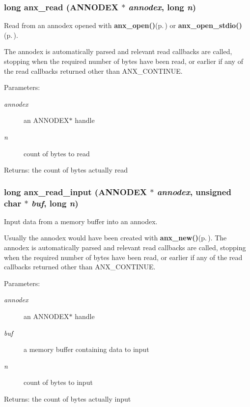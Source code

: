 \subsubsection{\setlength{\rightskip}{0pt plus 5cm}long anx\_\-read ({\bf ANNODEX} $\ast$ {\em annodex}, long {\em n})}\label{anx__read_8h_a16}


Read from an annodex opened with {\bf anx\_\-open()}{\rm (p.\,\pageref{anx__general_8h_a3})} or {\bf anx\_\-open\_\-stdio()}{\rm (p.\,\pageref{anx__general_8h_a4})}. 

The annodex is automatically parsed and relevant read callbacks are called, stopping when the required number of bytes have been read, or earlier if any of the read callbacks returned other than ANX\_\-CONTINUE. \begin{Desc}
\item[Parameters:]
\begin{description}
\item[{\em annodex}]an ANNODEX$\ast$ handle \item[{\em n}]count of bytes to read \end{description}
\end{Desc}
\begin{Desc}
\item[Returns:]the count of bytes actually read \end{Desc}
\subsubsection{\setlength{\rightskip}{0pt plus 5cm}long anx\_\-read\_\-input ({\bf ANNODEX} $\ast$ {\em annodex}, unsigned char $\ast$ {\em buf}, long {\em n})}\label{anx__read_8h_a17}


Input data from a memory buffer into an annodex. 

Usually the annodex would have been created with {\bf anx\_\-new()}{\rm (p.\,\pageref{anx__general_8h_a5})}. The annodex is automatically parsed and relevant read callbacks are called, stopping when the required number of bytes have been read, or earlier if any of the read callbacks returned other than ANX\_\-CONTINUE. \begin{Desc}
\item[Parameters:]
\begin{description}
\item[{\em annodex}]an ANNODEX$\ast$ handle \item[{\em buf}]a memory buffer containing data to input \item[{\em n}]count of bytes to input \end{description}
\end{Desc}
\begin{Desc}
\item[Returns:]the count of bytes actually input \end{Desc}
